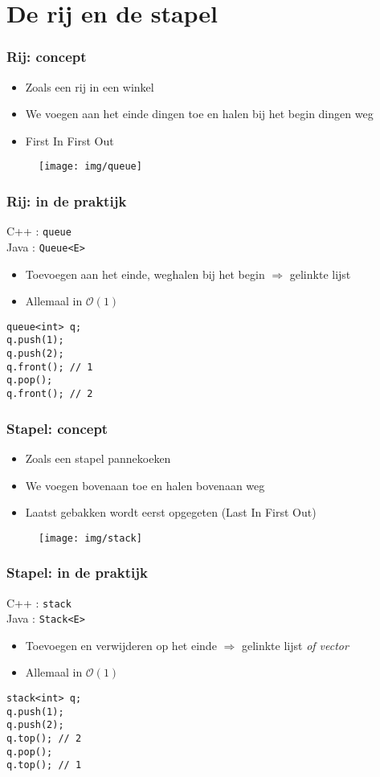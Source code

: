 \documentclass[12pt]{beamer}
\newcommand{\bigoh}[1]{\mathcal{O}\left(#1\right)}
\newcommand{\constant}{\bigoh{1}}
\begin{document}
\section{De rij en de stapel}

\begin{frame}
\frametitle{Rij: concept}
\begin{itemize}
\item Zoals een rij in een winkel
\item We voegen aan het einde dingen toe en halen bij het begin dingen weg
\item First In First Out
\end{itemize}
\begin{figure}
\centering
\texttt{[image: img/queue]}
\end{figure}
\end{frame}

\begin{frame}[fragile]
\frametitle{Rij: in de praktijk}
C++ : \texttt{queue} \\
Java : \texttt{Queue<E>}
\begin{itemize}
\item Toevoegen aan het einde, weghalen bij het begin $\Rightarrow$ gelinkte lijst
\item Allemaal in $\constant$
\end{itemize}
\begin{lstlisting}
queue<int> q;
q.push(1);
q.push(2);
q.front(); // 1
q.pop();
q.front(); // 2
\end{lstlisting}
\end{frame}

\begin{frame}
\frametitle{Stapel: concept}
\begin{itemize}
\item Zoals een stapel pannekoeken
\item We voegen bovenaan toe en halen bovenaan weg
\item Laatst gebakken wordt eerst opgegeten (Last In First Out)
\end{itemize}
\begin{figure}
\centering
\texttt{[image: img/stack]}
\end{figure}
\end{frame}

\begin{frame}[fragile]
\frametitle{Stapel: in de praktijk}
C++ : \texttt{stack} \\
Java : \texttt{Stack<E>}
\begin{itemize}
\item Toevoegen en verwijderen op het einde $\Rightarrow$ gelinkte lijst \emph{of vector}
\item Allemaal in $\constant$
\end{itemize}
\begin{lstlisting}
stack<int> q;
q.push(1);
q.push(2);
q.top(); // 2
q.pop();
q.top(); // 1
\end{lstlisting}
\end{frame}
\end{document}
